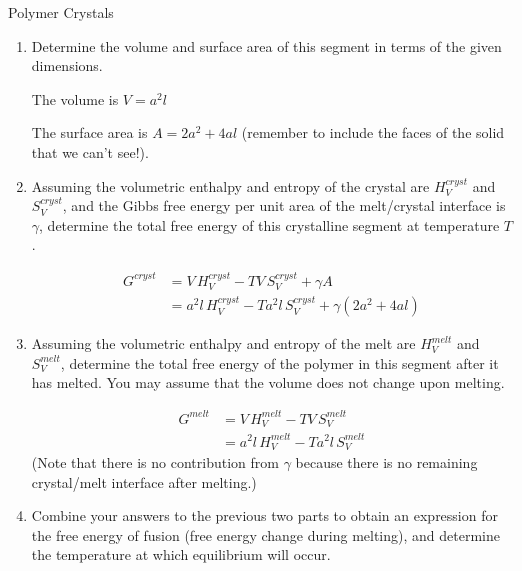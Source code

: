 \begin{activity}{Polymer Crystals}
\begin{exercises}
		\begin{enumerate}
			
			\item Determine the volume and surface area of this segment in terms of the given dimensions.
			
				\begin{solution}{}
					The volume is $V=a^2 l$
					
					The surface area is $A = 2a^2 + 4 al$ (remember to include the faces of the solid that we can't see!).
				\end{solution}
			
			\item Assuming the volumetric enthalpy and entropy of the crystal are $H_V^{cryst}$ and $S_V^{cryst}$, and the Gibbs free energy per unit area of the melt/crystal interface is $\gamma$, determine the total free energy of this crystalline segment at temperature $T$.
			
				\begin{solution}{}
					\begin{align*}
						G^{cryst} &= V\,H_V^{cryst} -T V\, S_V^{cryst} + \gamma A \\
							&= a^2 l\,H_V^{cryst} -T a^2 l\, S_V^{cryst} + \gamma (2a^2 + 4 al)
					\end{align*}
				\end{solution}
			
			\item Assuming the volumetric enthalpy and entropy of the melt are $H_V^{melt}$ and $S_V^{melt}$, determine the total free energy of the polymer in this segment after it has melted.  You may assume that the volume does not change upon melting.
			
				\begin{solution}{}
					\begin{align*}
						G^{melt} &= V\,H_V^{melt} -T V\, S_V^{melt} \\
							&= a^2 l\,H_V^{melt} -T a^2 l\, S_V^{melt}
					\end{align*}
					(Note that there is no contribution from $\gamma$ because there is no remaining crystal/melt interface after melting.)
				\end{solution}
				
			\item Combine your answers to the previous two parts to obtain an expression for the free energy of fusion (free energy change during melting), and determine the temperature at which equilibrium will occur.
			

\end{enumerate}
\end{exercises}
\end{activity}
